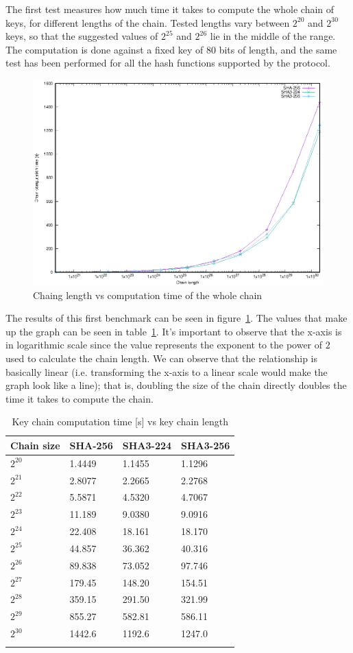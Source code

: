 \vspace{\baselineskip}

The first test measures how much time it takes to compute the whole chain of
keys, for different lengths of the chain. Tested lengths vary between $2^{20}$
and $2^{30}$ keys, so that the suggested values of $2^{25}$ and $2^{26}$ lie in
the middle of the range. The computation is done against a fixed key of $80$
bits of length, and the same test has been performed for all the hash functions
supported by the protocol.

\begin{figure}[h!]
  \includegraphics[width=\linewidth]{figures/chain_speed.eps}
  \caption{Chaing length vs computation time of the whole chain}
  \label{fig:bm1}
\end{figure}

The results of this first benchmark can be seen in figure~\ref{fig:bm1}. The values
that make up the graph can be seen in table~\ref{table:bm1}. It's important to
observe that the x-axis is in logarithmic scale since the value represents the
exponent to the power of $2$ used to calculate the chain length.  We can observe
that the relationship is basically linear (i.e. transforming the x-axis to a
linear scale would make the graph look like a line); that is, doubling the size
of the chain directly doubles the time it takes to compute the chain.

\begin{longtable}[]{@{}llll@{}}
\toprule
Chain size & SHA-256 & SHA3-224 & SHA3-256\tabularnewline
\midrule
\endhead
$2^{20}$ & 1.4449 & 1.1455 & 1.1296\tabularnewline
$2^{21}$ & 2.8077 & 2.2665 & 2.2768\tabularnewline
$2^{22}$ & 5.5871 & 4.5320 & 4.7067\tabularnewline
$2^{23}$ & 11.189 & 9.0380 & 9.0916\tabularnewline
$2^{24}$ & 22.408 & 18.161 & 18.170\tabularnewline
$2^{25}$ & 44.857 & 36.362 & 40.316\tabularnewline
$2^{26}$ & 89.838 & 73.052 & 97.746\tabularnewline
$2^{27}$ & 179.45 & 148.20 & 154.51\tabularnewline
$2^{28}$ & 359.15 & 291.50 & 321.99\tabularnewline
$2^{29}$ & 855.27 & 582.81 & 586.11\tabularnewline
$2^{30}$ & 1442.6 & 1192.6 & 1247.0\tabularnewline
\bottomrule
\caption{Key chain computation time [s] vs key chain length}
\label{table:bm1}
\end{longtable}

